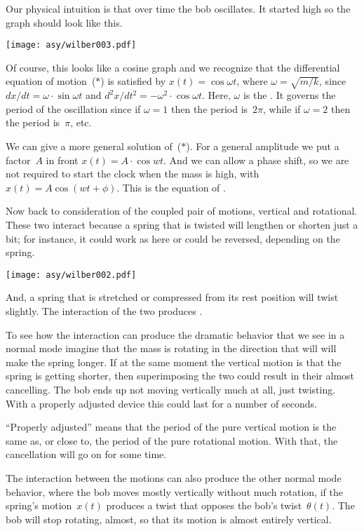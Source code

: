 Our physical intuition is that over time the bob oscillates.
It started high so 
the graph should look like this.
\begin{center}
  \texttt{[image: asy/wilber003.pdf]}
\end{center}
Of course, this looks like a cosine graph and we recognize 
that the differential equation of motion~($*$) is satisfied by
$x(t)=\cos \omega t$, where $\omega=\sqrt{m/k}$,
since $dx/dt=\omega\cdot \sin \omega t$
and $d^2x/dt^2=-\omega^2\cdot \cos \omega t$.
Here, $\omega$ is the .
It governs the period of the oscillation since if $\omega=1$ then the
period is~$2\pi$, while if $\omega=2$ then the period is~$\pi$, etc.

We can give a more general solution of~($*$).
For a general amplitude we put a factor~$A$ in front
$x(t)=A\cdot \cos wt$.
And we can allow a phase shift, 
so we are not required to start the clock when the
mass is high, with 
$x(t)=A\cos (wt+\phi)$.
This is the equation of .

Now back to consideration of the coupled pair of motions, 
vertical and rotational.
These two interact because a spring that is twisted will 
lengthen or shorten just a bit;
for instance, it could work as here or could be reversed, depending on the
spring.  
\begin{center}
  \texttt{[image: asy/wilber002.pdf]}
\end{center}
And, a spring that is stretched or compressed from its rest
position will twist slightly.
The interaction of the two produces .

To see how the interaction can produce the dramatic behavior that
we see in a normal mode
imagine that the mass is rotating in the direction that will 
will make the spring longer.
If at the same moment the vertical motion is that the spring 
is getting shorter, 
then superimposing the two
could result in their almost cancelling.
The bob ends up not moving vertically much at all, just twisting.
With a properly adjusted device this could last for a number of seconds.

``Properly adjusted'' means that  
the period of the pure vertical motion is the same as, 
or close to, the period of the pure rotational motion.
With that, the cancellation will go on for some time. 

The interaction between the motions can also produce the other normal mode 
behavior, where the bob moves mostly vertically without much rotation,
if the spring's motion~$x(t)$ 
produces a twist that opposes the bob's twist~$\theta(t)$.
The bob will stop rotating, almost, so that
its motion is almost entirely vertical.

